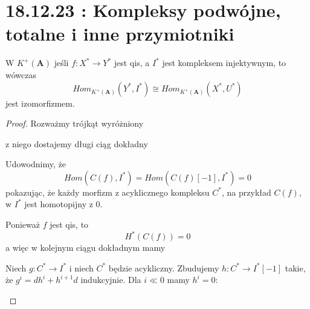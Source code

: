 \section{18.12.23 : Kompleksy podwójne, totalne i inne przymiotniki}
 
\begin{lemma}
  W $K^+(\mathbf{A})$ jeśli $f:X^*\to Y^*$ jest qis, a $I^*$ jest kompleksem injektywnym, to wówczas
  $$Hom_{K^+(\mathbf{A})}(Y^*, I^*)\cong Hom_{K^+(\mathbf{A})}(X^*, U^*)$$
  jest izomorfizmem.
\end{lemma}

\begin{proof}
  Rozważmy trójkąt wyróżniony
  \begin{center}\end{center}
  z niego dostajemy długi ciąg dokładny
  \begin{center}\end{center}
  Udowodnimy, że 
  $$Hom(C(f), I^*)=Hom(C(f)[-1],I^*)=0$$ 
  pokazując, że każdy morfizm z acyklicznego kompleksu $C^*$, na przykład $C(f)$, w $I^*$ jest homotopijny z $0$.

  Ponieważ $f$ jest qis, to 
  $$H^*(C(f))=0$$
  a więc w kolejnym ciągu dokładnym mamy
  \begin{center}\end{center}

  Niech $g:C^*\to I^*$ i niech $C^*$ będzie acykliczny. Zbudujemy $h:C^*\to I^*[-1]$ takie, że $g^i=dh^i+h^{i+1}d$ indukcyjnie. Dla $i\ll 0$ mamy $h^i=0$:
  \begin{center}\end{center}


\end{proof}
